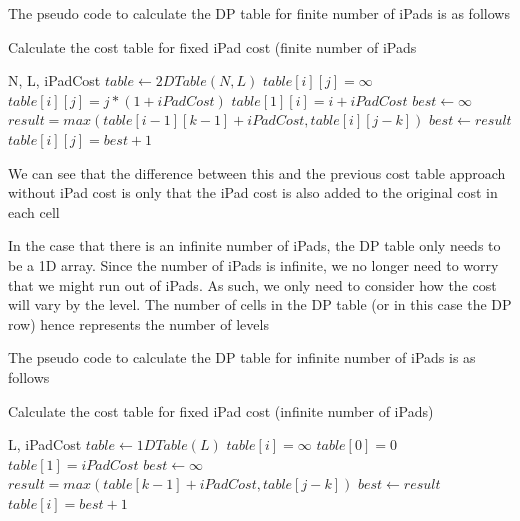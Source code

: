 \documentclass[12pt,a4paper,oneside]{report}
\begin{document}
The pseudo code to calculate the DP table for finite number of iPads is as follows

\begin{algorithm}[H]
\caption{Calculate the cost table for fixed iPad cost (finite number of iPads}
\begin{algorithmic}[1]
\REQUIRE N, L, iPadCost
\STATE $table \leftarrow 2DTable(N, L)$
		\STATE $table[i][j] = \infty$
	\ENDFOR
\ENDFOR
{}
		\STATE $table[i][j] = j*(1 + iPadCost)$
	\ENDFOR
\ENDFOR
{}
	\STATE $table[1][i] = i + iPadCost$
\ENDFOR
{}
		\STATE $best \leftarrow \infty$
			\STATE $result = max(table[i - 1][k - 1] + iPadCost, table[i][j - k])$
				\STATE $best \leftarrow result$
			\ENDIF
		\ENDFOR
		\STATE $table[i][j] = best + 1$
	\ENDFOR
\ENDFOR
\end{algorithmic}
\end{algorithm}

We can see that the difference between this and the previous cost table approach without iPad cost is only that the iPad cost is also added to the original cost in each cell

In the case that there is an infinite number of iPads, the DP table only needs to be a 1D array. Since the number of iPads is infinite, we no longer need to worry that we might run out of iPads. As such, we only need to consider how the cost will vary by the level. The number of cells in the DP table (or in this case the DP row) hence represents the number of levels

The pseudo code to calculate the DP table for infinite number of iPads is as follows

\begin{algorithm}[H]
\caption{Calculate the cost table for fixed iPad cost (infinite number of iPads)}
\begin{algorithmic}[1]
\REQUIRE L, iPadCost
\STATE $table \leftarrow 1DTable(L)$
	\STATE $table[i] = \infty$
\ENDFOR
\STATE $table[0] = 0$
\STATE $table[1] = iPadCost$
	\STATE $best \leftarrow \infty$
		\STATE $result = max(table[k - 1] + iPadCost, table[j - k])$
			\STATE $best \leftarrow result$
		\ENDIF
	\ENDFOR
	\STATE $table[i] = best + 1$
\ENDFOR
\end{algorithmic}
\end{algorithm}
\end{document}
